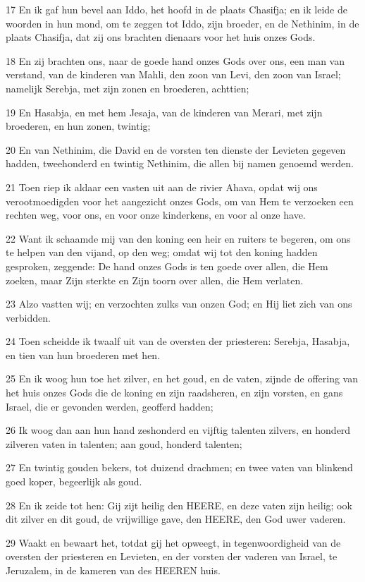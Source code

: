 \par 17 En ik gaf hun bevel aan Iddo, het hoofd in de plaats Chasifja; en ik leide de woorden in hun mond, om te zeggen tot Iddo, zijn broeder, en de Nethinim, in de plaats Chasifja, dat zij ons brachten dienaars voor het huis onzes Gods.
\par 18 En zij brachten ons, naar de goede hand onzes Gods over ons, een man van verstand, van de kinderen van Mahli, den zoon van Levi, den zoon van Israel; namelijk Serebja, met zijn zonen en broederen, achttien;
\par 19 En Hasabja, en met hem Jesaja, van de kinderen van Merari, met zijn broederen, en hun zonen, twintig;
\par 20 En van Nethinim, die David en de vorsten ten dienste der Levieten gegeven hadden, tweehonderd en twintig Nethinim, die allen bij namen genoemd werden.
\par 21 Toen riep ik aldaar een vasten uit aan de rivier Ahava, opdat wij ons verootmoedigden voor het aangezicht onzes Gods, om van Hem te verzoeken een rechten weg, voor ons, en voor onze kinderkens, en voor al onze have.
\par 22 Want ik schaamde mij van den koning een heir en ruiters te begeren, om ons te helpen van den vijand, op den weg; omdat wij tot den koning hadden gesproken, zeggende: De hand onzes Gods is ten goede over allen, die Hem zoeken, maar Zijn sterkte en Zijn toorn over allen, die Hem verlaten.
\par 23 Alzo vastten wij; en verzochten zulks van onzen God; en Hij liet zich van ons verbidden.
\par 24 Toen scheidde ik twaalf uit van de oversten der priesteren: Serebja, Hasabja, en tien van hun broederen met hen.
\par 25 En ik woog hun toe het zilver, en het goud, en de vaten, zijnde de offering van het huis onzes Gods die de koning en zijn raadsheren, en zijn vorsten, en gans Israel, die er gevonden werden, geofferd hadden;
\par 26 Ik woog dan aan hun hand zeshonderd en vijftig talenten zilvers, en honderd zilveren vaten in talenten; aan goud, honderd talenten;
\par 27 En twintig gouden bekers, tot duizend drachmen; en twee vaten van blinkend goed koper, begeerlijk als goud.
\par 28 En ik zeide tot hen: Gij zijt heilig den HEERE, en deze vaten zijn heilig; ook dit zilver en dit goud, de vrijwillige gave, den HEERE, den God uwer vaderen.
\par 29 Waakt en bewaart het, totdat gij het opweegt, in tegenwoordigheid van de oversten der priesteren en Levieten, en der vorsten der vaderen van Israel, te Jeruzalem, in de kameren van des HEEREN huis.
